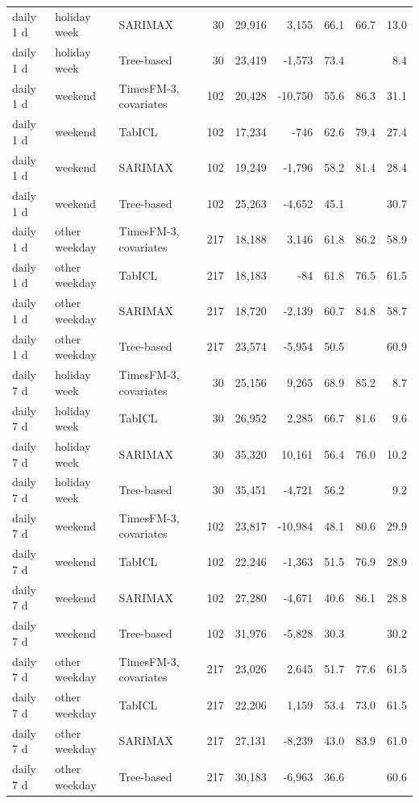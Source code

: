 \begin{tabular}{lllrrrrrr}
daily 1 d & holiday week & SARIMAX & 30 & 29,916 & 3,155 & 66.1 & 66.7 & 13.0 \\
daily 1 d & holiday week & Tree-based & 30 & 23,419 & -1,573 & 73.4 &  & 8.4 \\
daily 1 d & weekend & TimesFM-3, covariates & 102 & 20,428 & -10,750 & 55.6 & 86.3 & 31.1 \\
daily 1 d & weekend & TabICL & 102 & 17,234 & -746 & 62.6 & 79.4 & 27.4 \\
daily 1 d & weekend & SARIMAX & 102 & 19,249 & -1,796 & 58.2 & 81.4 & 28.4 \\
daily 1 d & weekend & Tree-based & 102 & 25,263 & -4,652 & 45.1 &  & 30.7 \\
daily 1 d & other weekday & TimesFM-3, covariates & 217 & 18,188 & 3,146 & 61.8 & 86.2 & 58.9 \\
daily 1 d & other weekday & TabICL & 217 & 18,183 & -84 & 61.8 & 76.5 & 61.5 \\
daily 1 d & other weekday & SARIMAX & 217 & 18,720 & -2,139 & 60.7 & 84.8 & 58.7 \\
daily 1 d & other weekday & Tree-based & 217 & 23,574 & -5,954 & 50.5 &  & 60.9 \\
daily 7 d & holiday week & TimesFM-3, covariates & 30 & 25,156 & 9,265 & 68.9 & 85.2 & 8.7 \\
daily 7 d & holiday week & TabICL & 30 & 26,952 & 2,285 & 66.7 & 81.6 & 9.6 \\
daily 7 d & holiday week & SARIMAX & 30 & 35,320 & 10,161 & 56.4 & 76.0 & 10.2 \\
daily 7 d & holiday week & Tree-based & 30 & 35,451 & -4,721 & 56.2 &  & 9.2 \\
daily 7 d & weekend & TimesFM-3, covariates & 102 & 23,817 & -10,984 & 48.1 & 80.6 & 29.9 \\
daily 7 d & weekend & TabICL & 102 & 22,246 & -1,363 & 51.5 & 76.9 & 28.9 \\
daily 7 d & weekend & SARIMAX & 102 & 27,280 & -4,671 & 40.6 & 86.1 & 28.8 \\
daily 7 d & weekend & Tree-based & 102 & 31,976 & -5,828 & 30.3 &  & 30.2 \\
daily 7 d & other weekday & TimesFM-3, covariates & 217 & 23,026 & 2,645 & 51.7 & 77.6 & 61.5 \\
daily 7 d & other weekday & TabICL & 217 & 22,206 & 1,159 & 53.4 & 73.0 & 61.5 \\
daily 7 d & other weekday & SARIMAX & 217 & 27,131 & -8,239 & 43.0 & 83.9 & 61.0 \\
daily 7 d & other weekday & Tree-based & 217 & 30,183 & -6,963 & 36.6 &  & 60.6 \\
\bottomrule
\end{tabular}
